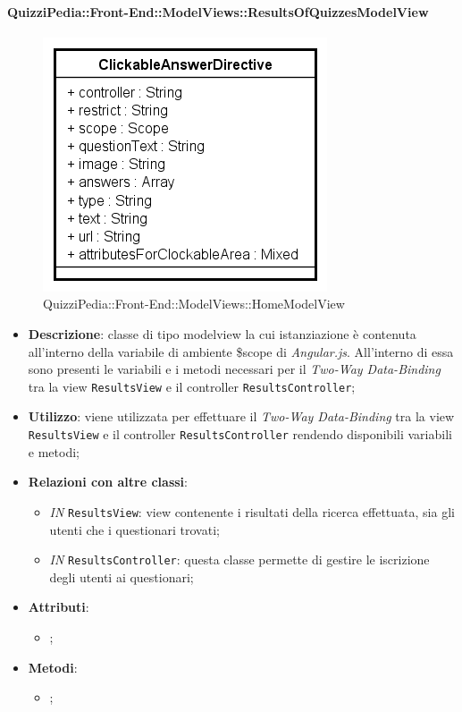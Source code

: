 	\paragraph{QuizziPedia::Front-End::ModelViews::ResultsOfQuizzesModelView}
	
	\label{QuizziPedia::Front-End::ModelViews::ResultsOfQuizzesModelView}
	
	\begin{figure}[ht]
		\centering
		\includegraphics[scale=0.5,keepaspectratio]{UML/Classi/Front-End/QuizziPedia_Front-end_Templates_ClickableAnswerTemplate.png}
		\caption{QuizziPedia::Front-End::ModelViews::HomeModelView}
	\end{figure} \FloatBarrier
	
	\begin{itemize}
		\item \textbf{Descrizione}: classe di tipo modelview la cui istanziazione è contenuta all'interno della variabile di ambiente \$scope di \textit{Angular.js}. All'interno di essa sono presenti le variabili e i metodi necessari per il \textit{Two-Way Data-Binding} tra la view \texttt{ResultsView} e il controller \texttt{ResultsController};
		\item \textbf{Utilizzo}: viene utilizzata per effettuare il \textit{Two-Way Data-Binding} tra la view \texttt{ResultsView} e il controller \texttt{ResultsController} rendendo disponibili variabili e metodi;
		\item \textbf{Relazioni con altre classi}: 
		\begin{itemize}
			\item \textit{IN} \texttt{ResultsView}: view contenente i risultati della ricerca effettuata, sia gli utenti che i questionari trovati; 
			\item \textit{IN} \texttt{ResultsController}: questa classe permette di gestire le iscrizione degli utenti ai questionari;
		\end{itemize}
		\item \textbf{Attributi}: 
		\begin{itemize}
			\item ;
		\end{itemize}
		\item \textbf{Metodi}: 
		\begin{itemize}
			\item ;
		\end{itemize}
	\end{itemize}
	
